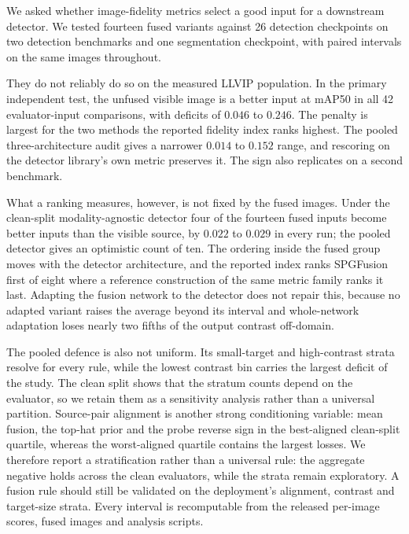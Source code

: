 \documentclass[preprint,10pt]{elsarticle}
\begin{document}
\begin{sloppypar}
We asked whether image-fidelity metrics select a good input for a downstream detector.
We tested fourteen fused variants against 26 detection checkpoints on two detection
benchmarks and one segmentation checkpoint, with paired intervals on the same images
throughout.

They do not reliably do so on the measured LLVIP population. In the primary independent test, the
unfused visible image is a better input at mAP50 in all 42 evaluator-input
comparisons, with deficits of $0.046$ to $0.246$. The penalty is largest for the two
methods the reported fidelity index ranks highest. The pooled three-architecture audit
gives a narrower $0.014$ to $0.152$ range, and rescoring on
the detector library's own metric preserves it. The sign also replicates on a second
benchmark.

What a ranking measures, however, is not fixed by the fused images. Under the
clean-split modality-agnostic detector four of the fourteen fused inputs become better
inputs than the visible source, by $0.022$ to $0.029$ in every run; the pooled detector
gives an optimistic count of ten. The ordering inside the fused group moves with the detector
architecture, and the reported index ranks SPGFusion first of eight where a reference
construction of the same metric family ranks it last. Adapting the fusion network to the
detector does not repair this, because no adapted variant raises the average beyond its
interval and whole-network adaptation loses nearly two fifths of the output contrast
off-domain.

The pooled defence is also not uniform. Its small-target and high-contrast strata
resolve for every rule, while the lowest contrast bin carries the largest deficit of
the study. The clean split shows that the stratum counts depend on the evaluator, so
we retain them as a sensitivity analysis rather than a universal partition.
Source-pair alignment is another strong conditioning variable: mean fusion, the top-hat
prior and the probe reverse sign in the best-aligned clean-split quartile, whereas the
worst-aligned quartile contains the largest losses. We therefore report a stratification
rather than a universal rule: the aggregate negative holds across the clean evaluators,
while the strata remain exploratory. A fusion rule should still be validated on the
deployment's alignment, contrast and target-size strata. Every interval is recomputable
from the released per-image scores, fused images and analysis scripts.
\end{sloppypar}
\end{document}
